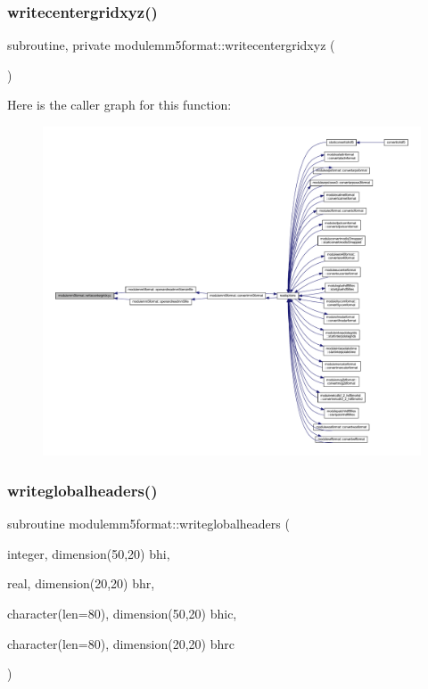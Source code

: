 \subsubsection{\texorpdfstring{writecentergridxyz()}{writecentergridxyz()}}
{\footnotesize\ttfamily subroutine, private modulemm5format\+::writecentergridxyz (\begin{DoxyParamCaption}{ }\end{DoxyParamCaption})\hspace{0.3cm}{\ttfamily [private]}}

Here is the caller graph for this function\+:\nopagebreak
\begin{figure}[H]
\begin{center}
\leavevmode
\includegraphics[width=350pt]{namespacemodulemm5format_a0042a10dda1e04b0a6aeb4d67aec1d11_icgraph}
\end{center}
\end{figure}
\mbox{\label{namespacemodulemm5format_a56429c53d699bf7bc1af81bd292f7d95}} 
\subsubsection{\texorpdfstring{writeglobalheaders()}{writeglobalheaders()}}
{\footnotesize\ttfamily subroutine modulemm5format\+::writeglobalheaders (\begin{DoxyParamCaption}\item[{integer, dimension(50,20)}]{bhi,  }\item[{real, dimension(20,20)}]{bhr,  }\item[{character(len=80), dimension(50,20)}]{bhic,  }\item[{character(len=80), dimension(20,20)}]{bhrc }\end{DoxyParamCaption})\hspace{0.3cm}{\ttfamily [private]}}

